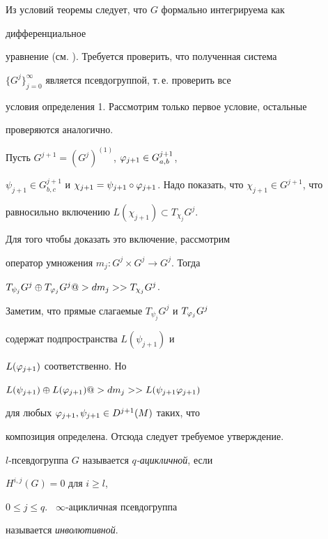 \begin{pf}


Из условий теоремы следует, что $G$ формально интегрируема как


дифференциальное


уравнение (см. \cite{Ly}). Требуется проверить, что полученная система


$\{G^j\}_{j=0}^\infty$ является псевдогруппой, т.\,е. проверить все


условия определения 1. Рассмотрим только первое условие, остальные


проверяются аналогично.





Пусть $G^{j+1}=(G^j)^{(1)}$, $\varphi_{j+1}\in G^{j+1}_{a,b}$,


$\psi_{j+1}\in G^{j+1}_{b,c}$ и $\chi_{j+1}=\psi_{j+1}\circ


\vp_{j+1}$. Надо показать, что $\chi_{j+1}\in G^{j+1}$, что


равносильно включению $L(\chi_{j+1})\subset T_{\chi_j}G^j$.


Для того чтобы доказать это включение, рассмотрим


оператор умножения $m_j:G^j\times G^j\to G^j$. Тогда


$T_{\psi_j}G^j\oplus T_{\vp_j}G^j@>{dm_j}>>


T_{\chi_j}G^j$.


Заметим, что прямые слагаемые $T_{\psi_j}G^j$ и $T_{\varphi_j}G^j$


содержат подпространства $L(\psi_{j+1})$ и


$L(\varphi_{j+1})$ соответственно. Но


$L(\psi_{j+1})\oplus L(\vp_{j+1})@>{dm_j}>>


L(\psi_{j+1}\vp_{j+1})$


для любых $\varphi_{j+1},\psi_{j+1}\in D^{j+1}(M)$ таких, что


композиция определена. Отсюда следует требуемое утверждение.


\end{pf}








$l$-псевдогруппа $G$ называется $q${\em -ацикличной}, если


$H^{i,j}(G)=0$ для $i\ge l$,


$0\le j\le q$. \ $\infty$-ацикличная псевдогруппа 


называется {\em инволютивной}.


